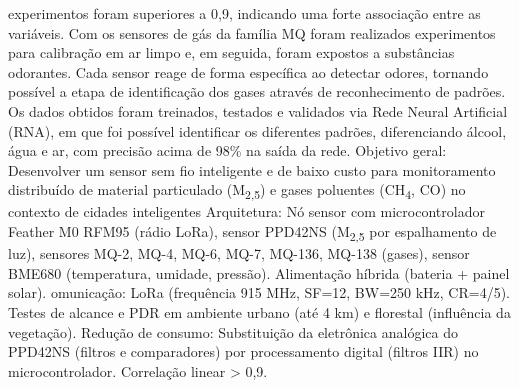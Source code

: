 \documentclass[12pt,a4paper]{article}
\begin{document}
{                                      experimentos foram superiores a 0,9, indicando uma forte associação entre as variáveis. Com os sensores 
                                      de gás da família MQ foram realizados experimentos para calibração em ar limpo e, em seguida, foram 
                                      expostos a substâncias odorantes. Cada sensor reage de forma específica ao detectar odores, tornando 
                                      possível a etapa de identificação dos gases através de reconhecimento de padrões. Os dados obtidos foram 
                                      treinados, testados e validados via Rede Neural Artificial (RNA), em que foi possível identificar os 
                                      diferentes padrões, diferenciando álcool, água e ar, com precisão acima de 98\% na saída da rede.}
                                     {Objetivo geral: Desenvolver um sensor sem fio inteligente e de baixo custo para monitoramento distribuído de 
                                     material particulado (M\textsubscript{2,5}) e gases poluentes (CH\textsubscript{4}, CO) no contexto de cidades inteligentes
                                     Arquitetura: Nó sensor com microcontrolador Feather M0 RFM95 (rádio LoRa), sensor PPD42NS 
                                     (M\textsubscript{2,5} por espalhamento de luz), sensores MQ-2, MQ-4, MQ-6, MQ-7, MQ-136, MQ-138 (gases),
                                     sensor BME680 (temperatura, umidade, pressão). Alimentação híbrida (bateria + painel solar).
                                     omunicação: LoRa (frequência 915 MHz, SF=12, BW=250 kHz, CR=4/5). Testes de alcance e PDR em ambiente urbano 
                                     (até 4 km) e florestal (influência da vegetação).
                                     Redução de consumo: Substituição da eletrônica analógica do PPD42NS (filtros e comparadores) 
                                     por processamento digital (filtros IIR) no microcontrolador. Correlação linear > 0,9.
                                     }
\end{document}
